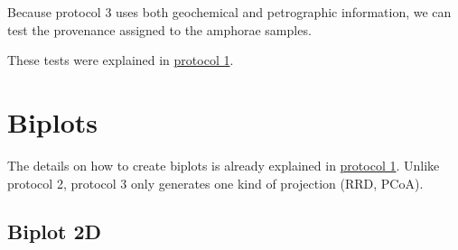 \documentclass[12pt,]{book}
\newenvironment{Shaded}{\begin{snugshade}}{\end{snugshade}}
\newcommand{\CommentTok}[1]{\textcolor[rgb]{0.56,0.35,0.01}{\textit{#1}}}
\newcommand{\KeywordTok}[1]{\textcolor[rgb]{0.13,0.29,0.53}{\textbf{#1}}}
\newcommand{\NormalTok}[1]{#1}
\newcommand{\OperatorTok}[1]{\textcolor[rgb]{0.81,0.36,0.00}{\textbf{#1}}}
\newcommand{\StringTok}[1]{\textcolor[rgb]{0.31,0.60,0.02}{#1}}
\begin{document}
Because protocol 3 uses both geochemical and petrographic information, we can test the provenance assigned to the amphorae samples.

\begin{Shaded}
\end{Shaded}

These tests were explained in \protect\hyperlink{tests}{protocol 1}.

\pagebreak

\hypertarget{biplots-1}{%
\section{Biplots}\label{biplots-1}}

The details on how to create biplots is already explained in \protect\hyperlink{biplot}{protocol 1}. Unlike protocol 2, protocol 3 only generates one kind of projection (RRD, PCoA).

\hypertarget{biplot-2d-2}{%
\subsection{Biplot 2D}\label{biplot-2d-2}}
\end{document}
